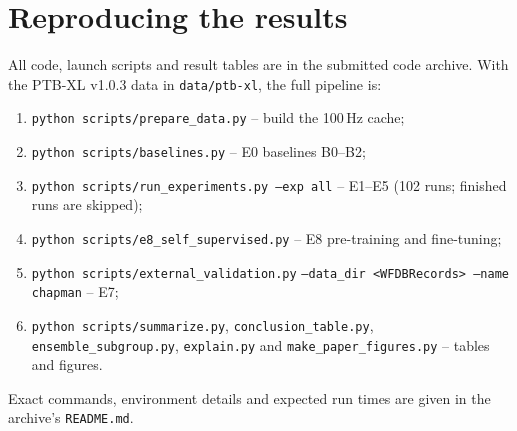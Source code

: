 \section{Reproducing the results}
\label{app:repro}
All code, launch scripts and result tables are in the submitted code archive. With the PTB-XL v1.0.3 data in \texttt{data/ptb-xl}, the full pipeline is:
\begin{enumerate}
  \item \texttt{python scripts/prepare\_data.py} -- build the 100\,Hz cache;
  \item \texttt{python scripts/baselines.py} -- E0 baselines B0--B2;
  \item \texttt{python scripts/run\_experiments.py --exp all} -- E1--E5 (102 runs; finished runs are skipped);
  \item \texttt{python scripts/e8\_self\_supervised.py} -- E8 pre-training and fine-tuning;
  \item \texttt{python scripts/external\_validation.py} \texttt{--data\_dir <WFDBRecords> --name chapman} -- E7;
  \item \texttt{python scripts/summarize.py}, \texttt{conclusion\_table.py}, \texttt{ensemble\_subgroup.py}, \texttt{explain.py} and \texttt{make\_paper\_figures.py} -- tables and figures.
\end{enumerate}
Exact commands, environment details and expected run times are given in the archive's \texttt{README.md}.

